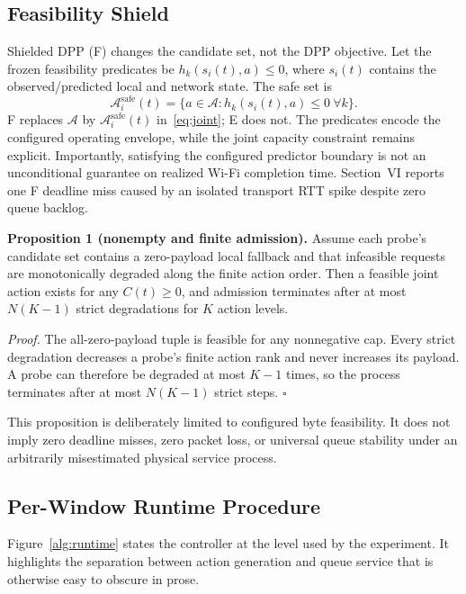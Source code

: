 \documentclass[10pt,journal]{IEEEtran}
\begin{document}
\subsection{Feasibility Shield}
Shielded DPP (F) changes the candidate set, not the DPP objective. Let the frozen feasibility predicates be $h_k(s_i(t),a)\le0$, where $s_i(t)$ contains the observed/predicted local and network state. The safe set is
\begin{equation}
  \mathcal A_i^{\mathrm{safe}}(t)
  =\{a\in\mathcal A: h_k(s_i(t),a)\le0\ \forall k\}.
  \label{eq:safeset}
\end{equation}
F replaces $\mathcal A$ by $\mathcal A_i^{\mathrm{safe}}(t)$ in~\eqref{eq:joint}; E does not. The predicates encode the configured operating envelope, while the joint capacity constraint remains explicit. Importantly, satisfying the configured predictor boundary is not an unconditional guarantee on realized Wi-Fi completion time. Section~VI reports one F deadline miss caused by an isolated transport RTT spike despite zero queue backlog.

\textbf{Proposition 1 (nonempty and finite admission).}
Assume each probe's candidate set contains a zero-payload local fallback and that infeasible requests are monotonically degraded along the finite action order. Then a feasible joint action exists for any $C(t)\ge0$, and admission terminates after at most $N(K-1)$ strict degradations for $K$ action levels.

\emph{Proof.} The all-zero-payload tuple is feasible for any nonnegative cap. Every strict degradation decreases a probe's finite action rank and never increases its payload. A probe can therefore be degraded at most $K-1$ times, so the process terminates after at most $N(K-1)$ strict steps. \hfill$\square$

This proposition is deliberately limited to configured byte feasibility. It does not imply zero deadline misses, zero packet loss, or universal queue stability under an arbitrarily misestimated physical service process.

\subsection{Per-Window Runtime Procedure}
Figure~\ref{alg:runtime} states the controller at the level used by the experiment. It highlights the separation between action generation and queue service that is otherwise easy to obscure in prose.
\end{document}
